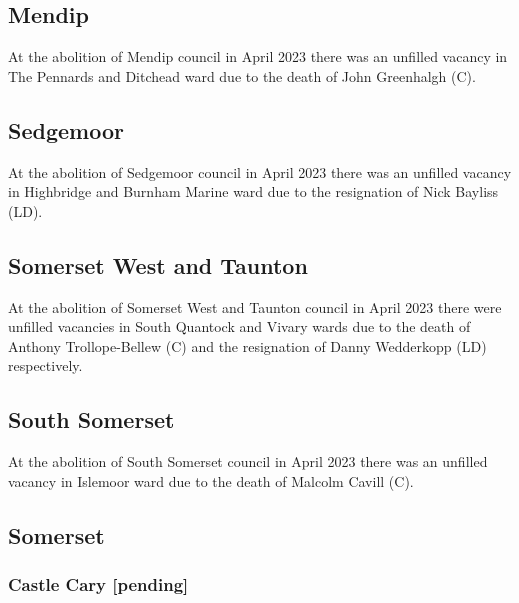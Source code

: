 \documentclass[a4paper,openany]{book}
\begin{document}
\begin{resultsiii}
\subsection*{Mendip}

At the abolition of Mendip council in April 2023 there was an unfilled vacancy in The Pennards and Ditchead ward due to the death of John Greenhalgh (C).%

\subsection*{Sedgemoor}

At the abolition of Sedgemoor council in April 2023 there was an unfilled vacancy in Highbridge and Burnham Marine ward due to the resignation of Nick Bayliss (LD).%

\subsection*{Somerset West and Taunton}

At the abolition of Somerset West and Taunton council in April 2023 there were unfilled vacancies in South Quantock and Vivary wards due to the death of Anthony Trollope-Bellew (C) and the resignation of Danny Wedderkopp (LD) respectively.%
%

\subsection*{South Somerset}

At the abolition of South Somerset council in April 2023 there was an unfilled vacancy in Islemoor ward due to the death of Malcolm Cavill (C).%

\subsection*{Somerset}

\subsubsection*{Castle Cary \hspace*{\fill}\nolinebreak[1]%
	\enspace\hspace*{\fill}
	[pending]}


\end{resultsiii}
\end{document}
